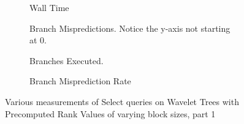 \begin{figure}\tiny
\begin{subfigure}{0.48\textwidth}
	
	\caption{Wall Time}
	\label{fig:PrecomputedRankBlockSize_Select_WallTime}
\end{subfigure}
\hfill
\begin{subfigure}{0.48\textwidth}
	
	\caption{Branch Mispredictions. Notice the y-axis not starting at 0.}
	\label{fig:PrecomputedRankBlockSize_Select_BranchMiss}
\end{subfigure}

\begin{subfigure}{0.48\textwidth}
	
	\caption{Branches Executed.}
	\label{fig:PrecomputedRankBlockSize_Select_BranchExe}
\end{subfigure}
\hfill
\begin{subfigure}{0.48\textwidth}
	
	\caption{Branch Misprediction Rate}
	\label{fig:PrecomputedRankBlockSize_Select_BranchMissRate}
\end{subfigure}
\caption{Various measurements of Select queries on Wavelet Trees with Precomputed Rank Values of varying block sizes, part 1}
\label{fig:PrecomputedRankBlockSize_Select}
\end{figure}

